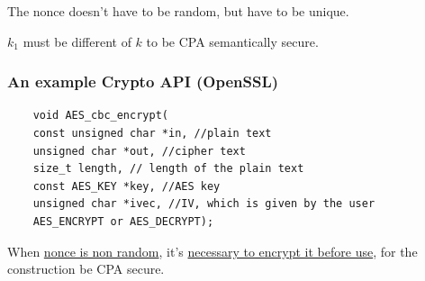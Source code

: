 \documentclass[12pt]{book}
\begin{document}
The nonce doesn't have to be random, but have to be unique.

$k_{1}$ must be different of $k$ to be CPA semantically secure.

\subsubsection{An example Crypto API (OpenSSL)}
\begin{verbatim}
	void AES_cbc_encrypt(
	const unsigned char *in, //plain text
	unsigned char *out, //cipher text
	size_t length, // length of the plain text
	const AES_KEY *key, //AES key
	unsigned char *ivec, //IV, which is given by the user
	AES_ENCRYPT or AES_DECRYPT);
\end{verbatim}
When \underline{nonce is non random}, it's \underline{necessary to encrypt it before use}, for the construction be CPA secure.
\end{document}
